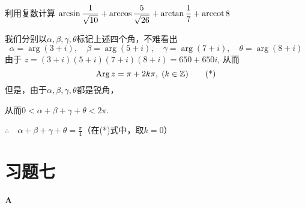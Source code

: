 \begin{example}
    利用复数计算
$\arcsin\frac{1}{\sqrt{10}}+\arccos\frac{5}{\sqrt{26}}+\arctan\frac{1}{7}+{\rm arccot\,}8$
\end{example}

\begin{solution}
我们分别以$\alpha,\beta,\gamma,\theta$标记上述四个角，不难看出
\[\alpha=\arg(3+i),\quad \beta=\arg(5+i),\quad \gamma=\arg(7+i),\quad \theta=\arg(8+i)\]
由于
$z=(3+i)(5+i)(7+i)(8+i)=650+650i$,
从而
\begin{equation}
    {\rm Arg\,}z=\pi+2k\pi,\; (k\in\Z)  \tag{*}
\end{equation}
但是，由于$\alpha,\beta,\gamma,\theta$都是锐角，

从而$0<\alpha+\beta+\gamma+\theta<2\pi$.

$\therefore\quad \alpha+\beta+\gamma+\theta=\frac{\pi}{4}$（在(*)式中，取$k=0$）
\end{solution}

\section*{习题七}
\begin{center}
    \bfseries A
\end{center}

